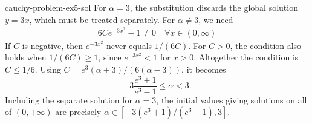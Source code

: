 \documentclass[preview]{standalone}
\begin{document}
\begin{snippetsolution}{cauchy-problem-ex5-sol}{}
    For \(\alpha=3\), the substitution discards the global solution \(y=3x\),
    which must be treated separately. For \(\alpha\neq3\), we need
    \begin{align*}
        6Ce^{-3x^2} - 1 \neq 0 \quad \forall x \in (0, \infty)
    \end{align*}
    If \(C\) is negative, then \(e^{-3x^2}\) never equals \(1/(6C)\).
    For \(C>0\), the condition also holds when \(1/(6C)\geq1\),
    since \(e^{-3x^2}<1\) for \(x>0\). Altogether the condition is \(C\leq1/6\).
    Using \(C=e^3(\alpha+3)/(6(\alpha-3))\), it becomes
    \[
        -3\frac{e^3+1}{e^3-1}\leq\alpha<3.
    \]
    Including the separate solution for \(\alpha=3\), the initial values
    giving solutions on all of \((0,+\infty)\) are precisely
    \(\alpha\in[-3(e^3+1)/(e^3-1),3]\).
\end{snippetsolution}
\end{document}
